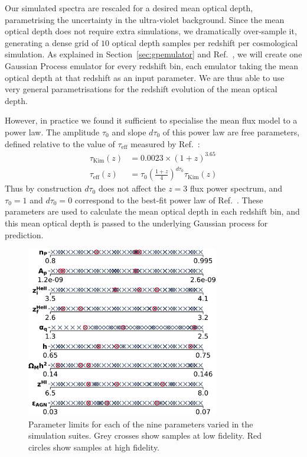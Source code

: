 \documentclass[a4paper,11pt]{article}
\begin{document}
Our simulated spectra are rescaled for a desired mean optical depth, parametrising the uncertainty in the ultra-violet background.
Since the mean optical depth does not require extra simulations, we dramatically over-sample it, generating a dense grid of $10$ optical depth samples per redshift per cosmological simulation. As explained in Section~\ref{sec:gpemulator} and Ref.~\cite{Bird:2019}, we will create one Gaussian Process emulator for every redshift bin, each emulator taking the mean optical depth at that redshift as an input parameter. We are thus able to use very general parametrisations for the redshift evolution of the mean optical depth.

However, in practice we found it sufficient to specialise the mean flux model to a power law. The amplitude $\tau_0$ and slope $d\tau_0$ of this power law are free parameters, defined relative to the value of $\tau_\mathrm{eff}$ measured by Ref.~\cite{Kim:2007}:
\begin{align}
\tau_\mathrm{Kim}(z) &= 0.0023 \times (1 + z)^{3.65} \\
 \tau_\mathrm{eff}(z) &= \tau_0 \left(\frac{1+z}{4}\right)^{d\tau_0}  \tau_\mathrm{Kim}(z)
 \label{eq:meanflux}
\end{align}
Thus by construction $d\tau_0$ does not affect the $z=3$ flux power spectrum, and $\tau_0 = 1$ and $d\tau_0 = 0$ correspond to the best-fit power law of Ref.~\cite{Kim:2007}. These parameters are used to calculate the mean optical depth in each redshift bin, and this mean optical depth is passed to the underlying Gaussian process for prediction.

\begin{figure}
    \centering
    \includegraphics[width=0.75\textwidth]{figures/sample_params.pdf}
    \caption{\label{fig:samples}
    Parameter limits for each of the nine parameters varied in the simulation suites.
    Grey crosses show samples at low fidelity. Red circles show samples at high fidelity.
    }
\end{figure}
\end{document}
